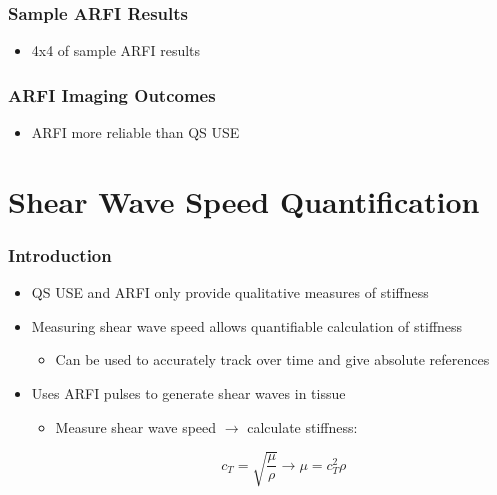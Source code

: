 \documentclass{beamer}
\begin{document}
		\begin{frame}
			\frametitle{Sample ARFI Results}
			\begin{itemize}
				\item 4x4 of sample ARFI results
			\end{itemize}
		\end{frame}

		\begin{frame}
			\frametitle{ARFI Imaging Outcomes}
			\begin{itemize}
				\item ARFI more reliable than QS USE
			\end{itemize}
		\end{frame}

	\section[Shear]{Shear Wave Speed Quantification}
		\begin{frame}
			\frametitle{Introduction}
			\begin{itemize}
				\item QS USE and ARFI only provide \alert{qualitative} measures of stiffness
				\item Measuring shear wave speed allows quantifiable calculation of stiffness
				\begin{itemize}
					\item Can be used to accurately track over time and give absolute references
				\end{itemize}
				\item Uses ARFI pulses to generate shear waves in tissue
				\begin{itemize}
					\item Measure shear wave speed $\rightarrow$ calculate stiffness:

					\begin{equation*}
						c_T = \sqrt{\frac{\mu}{\rho}} \rightarrow \mu = c_T^2 \rho
					\end{equation*}
				\end{itemize}
			\end{itemize}
		\end{frame}
\end{document}
